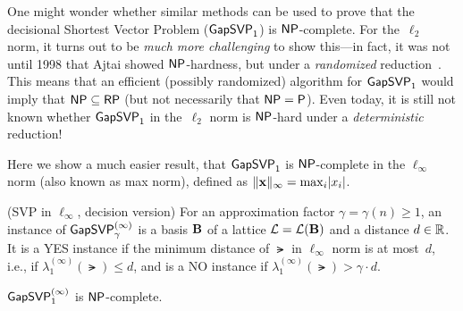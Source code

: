 \documentclass[11pt]{article}
\begin{document}
One might wonder whether similar methods can be used to prove that the
decisional Shortest Vector Problem ($\mathsf{GapSVP}_{1}$) is $\mathsf{NP}$-complete.
For the~$\ell_{2}$ norm, it turns out to be \emph{much more
  challenging} to show this---in fact, it was not until 1998 that
Ajtai showed $\mathsf{NP}$-hardness, but under a \emph{randomized}
reduction~\cite{DBLP:conf/stoc/Ajtai98}. This means that an efficient
(possibly randomized) algorithm for $\mathsf{GapSVP}_{1}$ would imply that
$\mathsf{NP} \subseteq \mathsf{RP}$ (but not necessarily that $\mathsf{NP} = \mathsf{P}$). Even
today, it is still not known whether $\mathsf{GapSVP}_{1}$ in the~$\ell_{2}$
norm is $\mathsf{NP}$-hard under a \emph{deterministic} reduction!

Here we show a much easier result, that $\mathsf{GapSVP}_{1}$ is $\mathsf{NP}$-complete
in the $\ell_{\infty}$ norm (also known as max norm), defined as
$\lVert\mathbf{x}\rVert_{\infty} = \max_{i} \lvert x_{i}\rvert$.

\begin{definition}(SVP in $\ell_{\infty}$, decision version)
  \label{def:gapsvp-inf}
  For an approximation factor $\gamma = \gamma(n) \geq 1$, an instance
  of $\mathsf{GapSVP}_{\gamma}^{(\infty)}$ is a basis $\mathbf{B}$ of a lattice
  $\mathcal{L}= \mathcal{L}(\mathbf{B})$ and a distance $d \in \mathbb{R}$. It is a YES instance
  if the minimum distance of $\lat$ in $\ell_{\infty}$ norm is at
  most~$d$, i.e., if $\lambda_{1}^{(\infty)}(\lat) \leq d$, and is a
  NO instance if $\lambda_{1}^{(\infty)}(\lat) > \gamma \cdot d$.
\end{definition}

\begin{theorem}
  \label{thm:gapsvp1-infty}
  $\mathsf{GapSVP}_{1}^{(\infty)}$ is $\mathsf{NP}$-complete.
\end{theorem}
\end{document}
